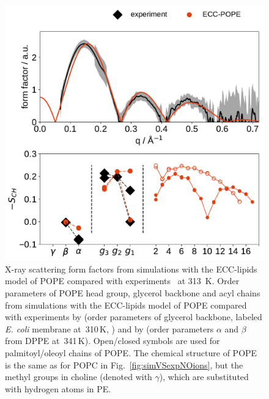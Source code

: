 \begin{figure}[tb!] 
  \centering 
  \includegraphics[width=\figwidth]{../img/ecc_pope/Order-parameters_form-factors_exp-ECC-POPE.pdf}
  \caption{\label{simVSexpNOions_POPE} 
    X-ray scattering form factors from simulations with 
    the ECC-lipids model of POPE compared with experiments~\cite{kucerka11} at 313~K. 
    Order parameters of POPE head group, glycerol backbone and acyl chains  
    from simulations with the ECC-lipids model of POPE
    compared with experiments by \citet{gally81} (order parameters of glycerol backbone, labeled \emph{E. coli} membrane at~310\,K, ) 
    and by \citet{seelig76, seelig80} (order parameters $\alpha$ and $\beta$ from DPPE at~341\,K).
    Open/closed symbols are used for palmitoyl/oleoyl chains of POPE. 
    The chemical structure of POPE is the same as for POPC in Fig.~\ref{fig:simVSexpNOions}, 
    but the methyl groups in choline (denoted with $\gamma$), which are substituted with hydrogen atoms in PE. 
  }  
\end{figure} 


